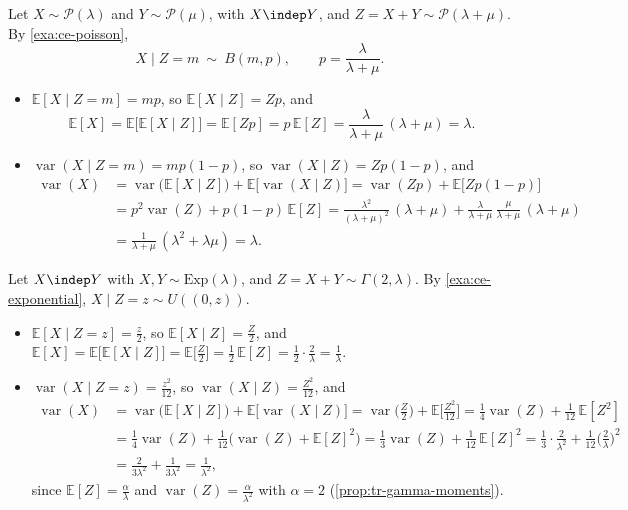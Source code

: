 \begin{example}\label{exa:cp-tv-poisson}
Let $X\sim\mathcal P(\lambda)$ and $Y\sim\mathcal P(\mu)$, with $X\indep Y$, and $Z=X+Y\sim\mathcal P(\lambda+\mu)$.
By \cref{exa:ce-poisson},
\[
  X\mid Z=m\ \sim\ B(m,p),\qquad p=\frac\lambda{\lambda+\mu}.
\]
\begin{itemize}
  \item $\mathbb E[X\mid Z=m]=mp$, so $\mathbb E[X\mid Z]=Zp$, and
    \[
      \mathbb E[X]=\mathbb E\big[\mathbb E[X\mid Z]\big]=\mathbb E[Zp]=p\,\mathbb E[Z]
      =\frac\lambda{\lambda+\mu}\,(\lambda+\mu)=\lambda .
    \]
  \item $\operatorname{var}(X\mid Z=m)=mp(1-p)$, so $\operatorname{var}(X\mid Z)=Zp(1-p)$, and
    \[
    \begin{aligned}
      \operatorname{var}(X)&=\operatorname{var}\big(\mathbb E[X\mid Z]\big)+\mathbb E\big[\operatorname{var}(X\mid Z)\big]
      =\operatorname{var}(Zp)+\mathbb E\big[Zp(1-p)\big]\\
      &=p^2\operatorname{var}(Z)+p(1-p)\,\mathbb E[Z]
      =\frac{\lambda^2}{(\lambda+\mu)^2}\,(\lambda+\mu)+\frac\lambda{\lambda+\mu}\,\frac\mu{\lambda+\mu}\,(\lambda+\mu)\\
      &=\frac1{\lambda+\mu}\,(\lambda^2+\lambda\mu)=\lambda .
    \end{aligned}
    \]
\end{itemize}
\end{example}

\begin{example}\label{exa:cp-tv-exponential}
Let $X\indep Y$ with $X,Y\sim\mathrm{Exp}(\lambda)$, and $Z=X+Y\sim\Gamma(2,\lambda)$. By
\cref{exa:ce-exponential}, $X\mid Z=z\sim U((0,z))$.
\begin{itemize}
  \item $\mathbb E[X\mid Z=z]=\frac z2$, so $\mathbb E[X\mid Z]=\frac Z2$, and
    $\mathbb E[X]=\mathbb E\big[\mathbb E[X\mid Z]\big]=\mathbb E\big[\frac Z2\big]=\frac12\,\mathbb E[Z]=\frac12\cdot\frac2\lambda=\frac1\lambda$.
  \item $\operatorname{var}(X\mid Z=z)=\frac{z^2}{12}$, so $\operatorname{var}(X\mid Z)=\frac{Z^2}{12}$, and
    \[
    \begin{aligned}
      \operatorname{var}(X)&=\operatorname{var}\big(\mathbb E[X\mid Z]\big)+\mathbb E\big[\operatorname{var}(X\mid Z)\big]
      =\operatorname{var}\Big(\frac Z2\Big)+\mathbb E\Big[\frac{Z^2}{12}\Big]
      =\frac14\operatorname{var}(Z)+\frac1{12}\,\mathbb E[Z^2]\\
      &=\frac14\operatorname{var}(Z)+\frac1{12}\big(\operatorname{var}(Z)+\mathbb E[Z]^2\big)
      =\frac13\operatorname{var}(Z)+\frac1{12}\,\mathbb E[Z]^2
      =\frac13\cdot\frac2{\lambda^2}+\frac1{12}\Big(\frac2\lambda\Big)^2\\
      &=\frac2{3\lambda^2}+\frac1{3\lambda^2}=\frac1{\lambda^2},
    \end{aligned}
    \]
    since $\mathbb E[Z]=\frac\alpha\lambda$ and $\operatorname{var}(Z)=\frac\alpha{\lambda^2}$ with
    $\alpha=2$ (\cref{prop:tr-gamma-moments}).
\end{itemize}
\end{example}


